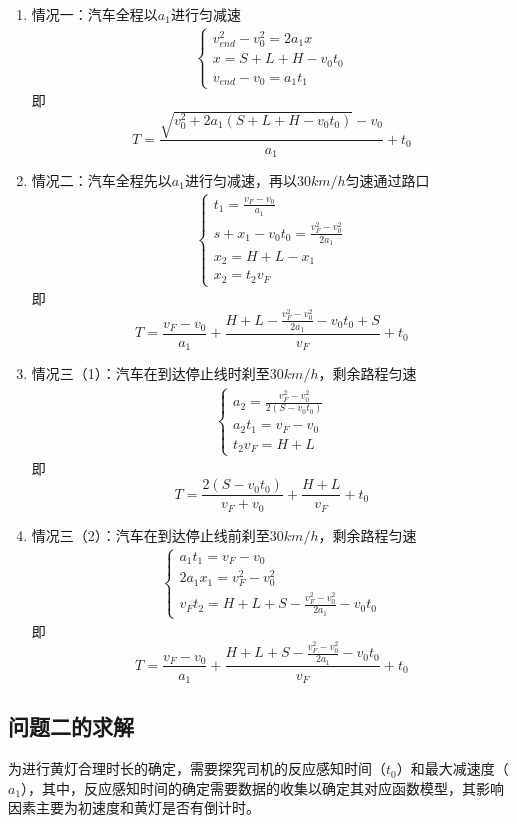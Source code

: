 \documentclass[withoutpreface,bwprint]{cumcmthesis}
\begin{document}
\begin{enumerate}
\item 情况一：汽车全程以$a_1$进行匀减速
	\begin{align*}
		\begin{cases}
				v_{end}^2 - v_0^2 = 2a_1x \\
				x = S + L + H -v_0t_0 \\
				v_{end} - v_0 = a_1t_1
			\end{cases}
	\end{align*}
	即
		$$T= \frac{{\sqrt{v_0^2 + 2a_1(S + L + H - v_0t_0)}-v_0}}{a_1} + t_0$$
\item 情况二：汽车全程先以$a_1$进行匀减速，再以30$km/h$匀速通过路口
	\begin{align*}
	\begin{cases}
		t_1 = \frac{v_F-v_0}{a_1} \\
		s + x_1 - v_0t_0 = \frac{v_F^2 - v_0^2}{2a_1} \\
		x_2 = H + L - x_1\\
		x_2 = t_2v_F
	\end{cases}
	\end{align*}
即
$$T= \frac{v_F - v_0}{a_1} + \frac{H + L - \frac{v_F^2 - v_0^2}{2a_1} - v_0t_0 + S}{v_F} + t_0$$
\item 情况三（1）：汽车在到达停止线时刹至30$km/h$，剩余路程匀速
\begin{align*}
	\begin{cases}
		a_2 = \frac{v_F^2 - v_0^2}{2(S-v_0t_0)}\\
		a_2t_1 = v_F - v_0\\
		t_2v_F = H + L
	\end{cases}
\end{align*}
即
$$T= \frac{2(S - v_0t_0)}{v_F + v_0} + \frac{H + L}{v_F} + t_0$$
\item 情况三（2）：汽车在到达停止线前刹至30$km/h$，剩余路程匀速
\begin{align*}
	\begin{cases}
		a_1t_1 = v_F - v_0\\
		2a_1x_1 = v_F^2 - v_0^2 \\
		v_Ft_2 = H + L + S - \frac{v_F^2 - v_0^2}{2a_1}-v_0t_0
	\end{cases}
\end{align*}
即
$$T= \frac{v_F - v_0}{a_1} + \frac{H + L + S - \frac{v_F^2 - v_0^2}{2a_1}-v_0t_0}{v_F} + t_0 $$
\end{enumerate}
\subsection{问题二的求解}
为进行黄灯合理时长的确定，需要探究司机的反应感知时间（$t_0$）和最大减速度（$a_1$），其中，反应感知时间的确定需要数据的收集以确定其对应函数模型，其影响因素主要为初速度和黄灯是否有倒计时。
\end{document}
